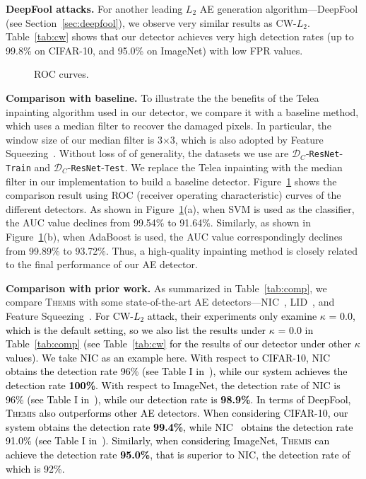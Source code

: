 \documentclass[sigconf]{acmart}
\newcommand{\oursys}{\textsc{Themis}\xspace}
\newcommand{\fedit}[1]{\textcolor{black}{#1}}
\begin{document}
\vspace{3pt}
\noindent \textbf{{DeepFool attacks.}}
For another leading $L_2$ AE generation algorithm---DeepFool (see Section~\ref{sec:deepfool}), we observe very similar results as CW-$L_2$. Table~\ref{tab:cw} shows that our detector achieves very high detection rates (up to 99.8\% on CIFAR-10, and 95.0\% on ImageNet) with low FPR values. 

\begin{figure}
     \caption{ROC curves.}
\label{fig:roc_detector}
\end{figure}

\vspace{3pt}
\noindent \textbf{{Comparison with baseline.}} 
To illustrate the the benefits of the Telea inpainting algorithm used in our detector, 
we compare it with a baseline method, which
uses a median filter to recover the damaged pixels. 
In particular, the window size of our median filter is 3$\times$3, which is also adopted by Feature Squeezing~\cite{xu2017feature}. Without loss of of generality, the datasets we use are $\mathcal{D}_C$-\texttt{ResNet}-\texttt{Train} and $\mathcal{D}_C$-\texttt{ResNet}-\texttt{Test}. 
We replace the Telea inpainting with the median filter in our implementation to build a
baseline detector.
Figure~\ref{fig:roc_detector} shows the comparison result using ROC (receiver operating characteristic) curves of the different detectors. As shown in Figure~\ref{fig:roc_detector}(a), when SVM is used as the classifier, the AUC value declines from 99.54\% to 91.64\%. Similarly, as shown in Figure~\ref{fig:roc_detector}(b), when AdaBoost is used, the AUC value correspondingly declines from 99.89\% to 93.72\%. Thus, a high-quality inpainting method is closely related to the final performance of our AE detector.

\vspace{3pt}
\noindent \textbf{{Comparison with prior work.}}
As summarized in Table~\ref{tab:comp},
we compare \oursys with some state-of-the-art AE detectors---NIC~\cite{ma2019nic}, LID~\cite{ma2018characterizing}, and Feature Squeezing~\cite{xu2017feature}. 
\fedit{For CW-$L_2$ attack, their experiments only examine $\kappa$ = 0.0, which is the default setting, so we also list the results under $\kappa$ = 0.0 in Table~\ref{tab:comp} (see Table~\ref{tab:cw} for the results of our detector under other $\kappa$ values). We take NIC as an example here. With respect to CIFAR-10, NIC obtains the detection rate 
 96\% (see Table I in~\cite{ma2019nic}), while our system achieves the detection rate \textbf{100\%}. With respect to ImageNet, the detection rate of NIC 
 is 96\% (see Table I in~\cite{ma2019nic}), while our detection rate is \textbf{98.9\%}. In terms of DeepFool, \oursys also outperforms other AE detectors. 
When considering CIFAR-10, our system obtains the detection rate \textbf{99.4\%}, while NIC~\cite{ma2019nic} obtains the detection rate 91.0\% (see Table I in~\cite{ma2019nic}). Similarly, when considering ImageNet, \oursys can achieve the detection rate \textbf{95.0\%}, that is superior to NIC, the detection rate of which is 92\%.}
\end{document}

